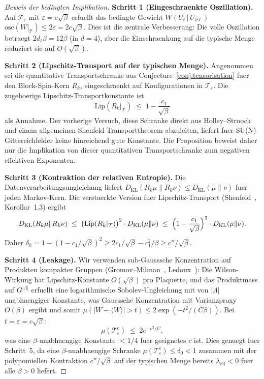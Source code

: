 \documentclass[12pt,a4paper]{article}
\theoremstyle{definition}
\theoremstyle{plain}
\theoremstyle{remark}
\begin{document}
\begin{proof}[Beweis der bedingten Implikation]
\textbf{Schritt 1 (Eingeschraenkte Oszillation).}
Auf $\mathcal{T}_\varepsilon$ mit $\varepsilon = c\sqrt{\beta}$
erfuellt das bedingte Gewicht $W(U_\ell \,|\, U_{\partial\ell})$
$\mathrm{osc}(W|_{\mathcal{T}}) \leq 2\varepsilon = 2c\sqrt{\beta}$.
Dies ist die zentrale Verbesserung: Die volle Oszillation betraegt $2 d_\ell \beta = 12\beta$
(in $d=4$), aber die Einschraenkung auf die typische Menge reduziert sie auf $O(\sqrt{\beta})$.

\medskip
\textbf{Schritt 2 (Lipschitz-Transport auf der typischen Menge).}
Angenommen sei die quantitative Transportschranke aus Conjecture~\ref{conj:tensorisation}
fuer den Block-Spin-Kern $R_k$, eingeschraenkt auf Konfigurationen in
$\mathcal{T}_\varepsilon$. Die zugehoerige Lipschitz-Transportkonstante ist
\[
  \mathrm{Lip}(R_k|_{\mathcal{T}})
  \;\leq\; 1 - \frac{c_1}{\sqrt{\beta}}
\]
als Annahme. Der vorherige Versuch, diese Schranke direkt aus Holley--Stroock
und einem allgemeinen Shenfeld-Transporttheorem abzuleiten, liefert fuer
SU(N)-Gittereichfelder keine hinreichend gute Konstante. Die Proposition
beweist daher nur die Implikation von dieser quantitativen Transportschranke
zum negativen effektiven Exponenten.

\medskip
\textbf{Schritt 3 (Kontraktion der relativen Entropie).}
Die Datenverarbeitungsungleichung liefert $D_{\mathrm{KL}}(R_k\mu \| R_k\nu) \leq D_{\mathrm{KL}}(\mu\|\nu)$
fuer jeden Markov-Kern. Die verstaerkte Version fuer Lipschitz-Transport
(Shenfeld~\cite{Shenfeld2024}, Korollar~1.3) ergibt
\[
  D_{\mathrm{KL}}(R_k\mu \| R_k\nu)
  \;\leq\; \bigl(\mathrm{Lip}(R_k|_{\mathcal{T}})\bigr)^2 \cdot D_{\mathrm{KL}}(\mu\|\nu)
  \;\leq\; \Bigl(1 - \frac{c_1}{\sqrt{\beta}}\Bigr)^2 \cdot D_{\mathrm{KL}}(\mu\|\nu).
\]
Daher $\delta_k = 1 - (1 - c_1/\sqrt{\beta})^2 \geq 2c_1/\sqrt{\beta} - c_1^2/\beta \geq c''/\sqrt{\beta}$.

\medskip
\textbf{Schritt 4 (Leakage).}
Wir verwenden sub-Gausssche Konzentration auf Produkten kompakter Gruppen
(Gromov--Milman~\cite{GromovMilman1983}, Ledoux~\cite{Ledoux2001}):
Die Wilson-Wirkung hat Lipschitz-Konstante $O(\sqrt{\beta})$ pro Plaquette,
und das Produktmass auf $G^{|\Lambda|}$ erfuellt eine logarithmische
Sobolev-Ungleichung mit von $|\Lambda|$ unabhaengiger Konstante, was Gausssche
Konzentration mit Varianzproxy $O(\beta)$ ergibt
und somit $\mu(|W - \langle W\rangle| > t) \leq 2\exp(-t^2/(C\beta))$.
Bei $t = \varepsilon = c\sqrt{\beta}$:
\[
  \mu(\mathcal{T}_\varepsilon^c) \;\leq\; 2e^{-c^2/C},
\]
was eine $\beta$-unabhaengige Konstante $< 1/4$ fuer geeignetes $c$ ist.
Dies genuegt fuer Schritt~5, da eine $\beta$-unabhaengige Schranke
$\mu(\mathcal{T}_\varepsilon^c) \leq \delta_0 < 1$ zusammen mit der
polynomiellen Kontraktion $c''/\sqrt{\beta}$ auf der typischen Menge
bereits $\lambda_{\mathrm{eff}} < 0$ fuer alle $\beta > 0$ liefert.


\end{proof}
\end{document}
